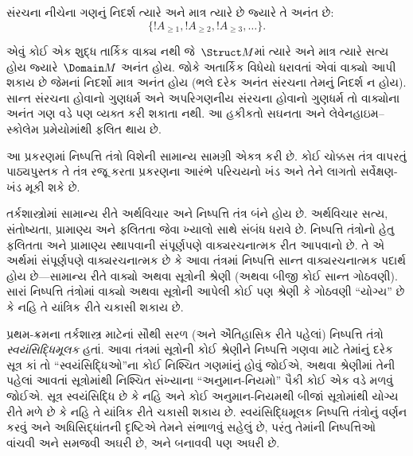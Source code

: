 \begin{prop}
સંરચના નીચેના ગણનું નિદર્શ ત્યારે અને માત્ર ત્યારે છે જ્યારે
તે અનંત છે:
\[
\{!A_{\ge 1}, !A_{\ge 2}, !A_{\ge 3}, \dots \}.
\]
\end{prop}

એવું કોઈ એક શુદ્ધ તાર્કિક વાક્ય નથી જે~$\Struct M$માં ત્યારે અને માત્ર
ત્યારે સત્ય હોય જ્યારે~$\Domain M$ અનંત હોય. જોકે અતાર્કિક
વિધેયો ધરાવતાં એવાં વાક્યો આપી શકાય છે જેમનાં નિદર્શો
માત્ર અનંત હોય (ભલે દરેક અનંત સંરચના તેમનું નિદર્શ ન હોય).
સાન્ત સંરચના હોવાનો ગુણધર્મ અને અપરિગણનીય સંરચના હોવાનો ગુણધર્મ તો
વાક્યોના અનંત ગણ વડે પણ વ્યક્ત કરી શકાતા નથી. આ હકીકતો સઘનતા
અને લેવેનહાઇમ--સ્કોલેમ પ્રમેયોમાંથી ફલિત થાય છે.
\endgroup


\OLEndChapterHook
\endgroup


\begingroup
\makeatletter{}\makeatother

\label{guunit:OLP-0063}

\begin{editorial}
આ પ્રકરણમાં નિષ્પત્તિ તંત્રો વિશેની સામાન્ય સામગ્રી એકત્ર કરી છે.
કોઈ ચોક્કસ તંત્ર વાપરતું પાઠ્યપુસ્તક તે તંત્ર રજૂ કરતા પ્રકરણના આરંભે
પરિચયનો ખંડ અને તેને લાગતો સર્વેક્ષણ-ખંડ મૂકી શકે છે.
\end{editorial}

\begingroup
\makeatletter{}\makeatother


\label{guunit:OLP-0064}


તર્કશાસ્ત્રોમાં સામાન્ય રીતે અર્થવિચાર અને નિષ્પત્તિ તંત્ર બંને
હોય છે. અર્થવિચાર સત્ય, સંતોષ્યતા, પ્રામાણ્ય અને ફલિતતા જેવા ખ્યાલો
સાથે સંબંધ ધરાવે છે. નિષ્પત્તિ તંત્રોનો હેતુ ફલિતતા અને
પ્રામાણ્ય સ્થાપવાની સંપૂર્ણપણે વાક્યરચનાત્મક રીત આપવાનો છે. તે એ
અર્થમાં સંપૂર્ણપણે વાક્યરચનાત્મક છે કે આવા તંત્રમાં નિષ્પત્તિ
સાન્ત વાક્યરચનાત્મક પદાર્થ હોય છે—સામાન્ય રીતે વાક્યો અથવા
સૂત્રોની શ્રેણી (અથવા બીજી કોઈ સાન્ત ગોઠવણી). સારાં
નિષ્પત્તિ તંત્રોમાં વાક્યો અથવા સૂત્રોની આપેલી કોઈ
પણ શ્રેણી કે ગોઠવણી ``યોગ્ય'' છે કે નહિ તે યાંત્રિક રીતે ચકાસી શકાય છે.

પ્રથમ-ક્રમના તર્કશાસ્ત્ર માટેનાં સૌથી સરળ (અને ઐતિહાસિક રીતે પહેલાં)
નિષ્પત્તિ તંત્રો \emph{સ્વયંસિદ્ધિમૂલક} હતાં. આવા તંત્રમાં
સૂત્રોની કોઈ શ્રેણીને નિષ્પત્તિ ગણવા માટે તેમાંનું દરેક
સૂત્ર કાં તો ``સ્વયંસિદ્ધિઓ''ના કોઈ નિશ્ચિત ગણમાંનું હોવું જોઈએ,
અથવા શ્રેણીમાં તેની પહેલાં આવતાં સૂત્રોમાંથી નિશ્ચિત સંખ્યાના
``અનુમાન-નિયમો'' પૈકી કોઈ એક વડે મળવું જોઈએ. સૂત્ર
સ્વયંસિદ્ધિ છે કે નહિ અને કોઈ અનુમાન-નિયમથી બીજાં સૂત્રોમાંથી
યોગ્ય રીતે મળે છે કે નહિ તે યાંત્રિક રીતે ચકાસી શકાય છે.
સ્વયંસિદ્ધિમૂલક નિષ્પત્તિ તંત્રોનું વર્ણન કરવું અને
અધિસિદ્ધાંતની દૃષ્ટિએ તેમને સંભાળવું સહેલું છે, પરંતુ તેમાંની
નિષ્પત્તિઓ વાંચવી અને સમજવી અઘરી છે, અને બનાવવી પણ અઘરી છે.

